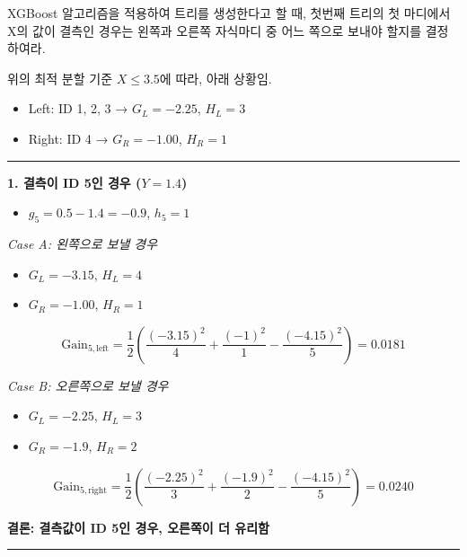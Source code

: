 \documentclass[
  a4paper,
  DIV=11,
  numbers=noendperiod]{scrreprt}
\providecommand{\tightlist}{%
  \setlength{\itemsep}{0pt}\setlength{\parskip}{0pt}}\usepackage{longtable,booktabs,array}
\begin{document}
XGBoost 알고리즘을 적용하여 트리를 생성한다고 할 때, 첫번째 트리의 첫
마디에서 X의 값이 결측인 경우는 왼쪽과 오른쪽 자식마디 중 어느 쪽으로
보내야 할지를 결정하여라.

위의 최적 분할 기준 \(X \leq 3.5\)에 따라, 아래 상황임.

\begin{itemize}
\tightlist
\item
  Left: ID 1, 2, 3 → \(G_L = -2.25\), \(H_L = 3\)\\
\item
  Right: ID 4 → \(G_R = -1.00\), \(H_R = 1\)
\end{itemize}

\begin{center}\rule{0.5\linewidth}{0.5pt}\end{center}

\textbf{1. 결측이 ID 5인 경우 (\(Y = 1.4\))}

\begin{itemize}
\tightlist
\item
  \(g_5 = 0.5 - 1.4 = -0.9\), \(h_5 = 1\)
\end{itemize}

\emph{Case A: 왼쪽으로 보낼 경우}

\begin{itemize}
\tightlist
\item
  \(G_L = -3.15\), \(H_L = 4\)
\item
  \(G_R = -1.00\), \(H_R = 1\)
\end{itemize}

\[
\text{Gain}_{5,\text{left}} = \frac{1}{2} \left( \frac{(-3.15)^2}{4} + \frac{(-1)^2}{1} - \frac{(-4.15)^2}{5} \right) = 0.0181
\]

\emph{Case B: 오른쪽으로 보낼 경우}

\begin{itemize}
\tightlist
\item
  \(G_L = -2.25\), \(H_L = 3\)
\item
  \(G_R = -1.9\), \(H_R = 2\)
\end{itemize}

\[
\text{Gain}_{5,\text{right}} = \frac{1}{2} \left( \frac{(-2.25)^2}{3} + \frac{(-1.9)^2}{2} - \frac{(-4.15)^2}{5} \right) = 0.0240
\]

\textbf{결론: 결측값이 ID 5인 경우, 오른쪽이 더 유리함}

\begin{center}\rule{0.5\linewidth}{0.5pt}\end{center}
\end{document}
